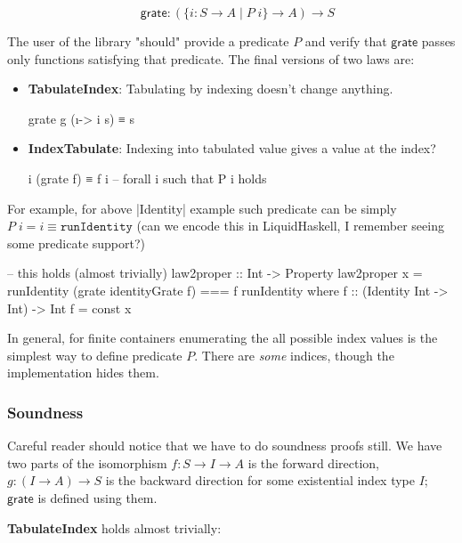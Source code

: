 \documentclass{article}
\begin{document}
\begin{equation}
  \quad \mathsf{grate} : (\{ i : S \to A \mid P\; i \} \to A) \to S
\end{equation}

The user of the library "should" provide a predicate $P$
and verify that $\mathsf{grate}$ passes only functions satisfying
that predicate. The final versions of two laws are:

\begin{itemize}
  \item \textbf{TabulateIndex}: Tabulating by indexing doesn't change anything.

\begin{code}
grate g (\i -> i s) ≡ s
\end{code}

\item \textbf{IndexTabulate}: Indexing into tabulated value gives a value at the index?

\begin{code}
i (grate f) ≡ f i  -- forall i such that P i holds
\end{code}
\end{itemize}

For example, for above |Identity| example such predicate can be simply
$P\;i = i \equiv \mathtt{runIdentity}$
(can we encode this in LiquidHaskell, I  remember seeing some predicate support?)

\begin{code}
-- this holds (almost trivially)
law2proper :: Int -> Property
law2proper x = runIdentity (grate identityGrate f) === f runIdentity where
    f :: (Identity Int -> Int) -> Int
    f = const x
\end{code}

In general, for finite containers enumerating the all possible index values
is the simplest way to define predicate $P$.
There are \emph{some} indices, though the implementation hides them.

\subsubsection{Soundness}

Careful reader should notice that we have to do soundness proofs still.
 We have two parts of the isomorphism
$f : S \to I \to A$ is the forward direction,
$g : (I \to A) \to S $ is the backward direction for some existential index type $I$;
$\mathsf{grate}$ is defined using them.

\textbf{TabulateIndex} holds almost trivially:
\end{document}

